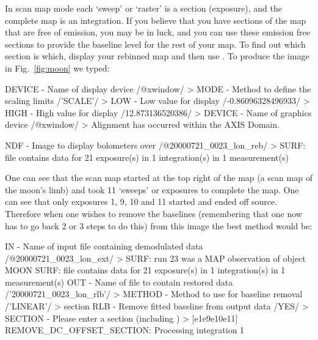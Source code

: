 \documentclass[twoside,11pt,noabs]{starlink}
\providecommand{\task}[1]{\textsf{#1}}
\providecommand{\scuover}{\xref{\task{scuover}}{sun216}{SCUOVER}}
\begin{document}
In scan map mode each `sweep' or `raster' is a section (exposure), and
the complete map is an integration. If you believe that you have
sections of the map that are free of emission, you may be in luck, and
you can use these emission free sections to provide the baseline level
for the rest of your map. To find out which section is which, display
your rebinned map and then use \scuover. To produce the image in Fig.\
\ref{fig:moon} we typed:

\begin{small}
\begin{terminalv}
DEVICE - Name of display device /@xwindow/ >
MODE - Method to define the scaling limits /'SCALE'/ >
LOW - Low value for display /-0.86096328496933/ >
HIGH - High value for display /12.873136520386/ >
DEVICE - Name of graphics device /@xwindow/ >
Alignment has occurred within the AXIS Domain.

NDF - Image to display bolometers over /@20000721_0023_lon_reb/ >
SURF: file contains data for 21 exposure(s) in 1 integration(s) in 1
measurement(s)
\end{terminalv}
\end{small}

One can see that the scan map started at the top right of the map (a
scan map of the moon's limb) and took 11 `sweeps' or exposures to
complete the map.  One can see that only exposures 1, 9, 10 and 11
started and ended off source.  Therefore when one wishes to remove the
baselines (remembering that one now has to go back 2 or 3 steps to do
this) from this image the best method would be:

\begin{small}
\begin{terminalv}
IN - Name of input file containing demodulated data
/@20000721_0023_lon_ext/ >
SURF: run 23 was a MAP observation of object MOON
SURF: file contains data for 21 exposure(s) in 1 integration(s) in 1
measurement(s)
OUT - Name of file to contain restored data /'20000721_0023_lon_rlb'/
>
METHOD - Method to use for baseline removal /'LINEAR'/ > section
RLB - Remove fitted baseline from output data /YES/ >
SECTION - Please enter a section (including {}) > [{e1}{e9}{e10}{e11}]
REMOVE_DC_OFFSET_SECTION: Processing integration 1
\end{terminalv}
\end{small}
\end{document}
